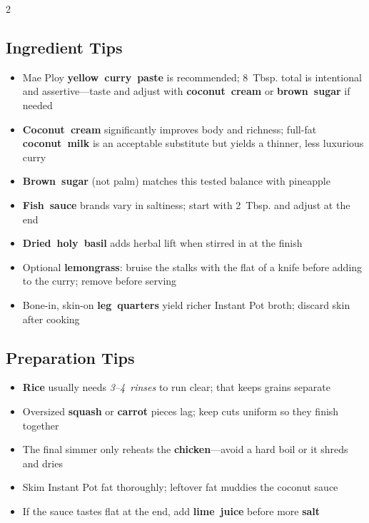 \documentclass[11pt,letterpaper]{article}
\begin{document}
{\begin{multicols}{2}
\subsection*{Ingredient Tips}
\begin{itemize}
    \item Mae Ploy \textbf{yellow~curry~paste} is recommended; 8~Tbsp. total is intentional and assertive---taste and adjust with \textbf{coconut~cream} or \textbf{brown~sugar} if needed
    \item \textbf{Coconut~cream} significantly improves body and richness; full-fat \textbf{coconut~milk} is an acceptable substitute but yields a thinner, less luxurious curry
    \item \textbf{Brown~sugar} (not palm) matches this tested balance with pineapple
    \item \textbf{Fish~sauce} brands vary in saltiness; start with 2~Tbsp. and adjust at the end
    \item \textbf{Dried~holy~basil} adds herbal lift when stirred in at the finish
    \item Optional \textbf{lemongrass}: bruise the stalks with the flat of a knife before adding to the curry; remove before serving
    \item Bone-in, skin-on \textbf{leg~quarters} yield richer Instant Pot broth; discard skin after cooking
\end{itemize}

\subsection*{Preparation Tips}
\begin{itemize}
    \item \textbf{Rice} usually needs \textit{3--4~rinses} to run clear; that keeps grains separate
    \item Oversized \textbf{squash} or \textbf{carrot} pieces lag; keep cuts uniform so they finish together
    \item The final simmer only reheats the \textbf{chicken}---avoid a hard boil or it shreds and dries
    \item Skim Instant Pot fat thoroughly; leftover fat muddies the coconut sauce
    \item If the sauce tastes flat at the end, add \textbf{lime~juice} before more \textbf{salt}
\end{itemize}


\end{multicols}}
\end{document}
